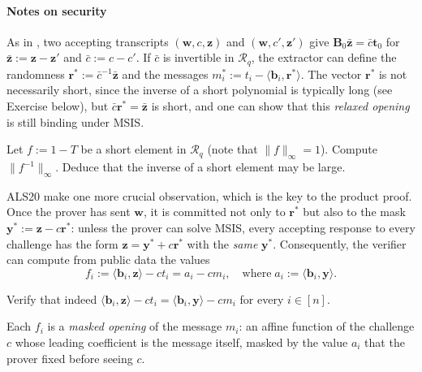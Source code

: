\documentclass[../../book.tex]{subfiles}
\begin{document}
\paragraph{Notes on security} As in , two accepting transcripts $(\mathbf{w}, c, \mathbf{z})$ and $(\mathbf{w}, c', \mathbf{z}')$ give $\mathbf{B}_0\bar{\mathbf{z}} = \bar{c}\mathbf{t}_0$ for $\bar{\mathbf{z}} := \mathbf{z}-\mathbf{z}'$ and $\bar{c} := c-c'$.
If $\bar{c}$ is invertible in $\mathcal{R}_q$, the extractor can define the randomness $\mathbf{r}^{\ast} := \bar{c}^{-1}\bar{\mathbf{z}}$ and the messages $m_i^{\ast} := t_i - \langle \mathbf{b}_i, \mathbf{r}^{\ast} \rangle$.
The vector $\mathbf{r}^{\ast}$ is not necessarily short, since the inverse of a short polynomial is typically long (see Exercise below), but $\bar{c}\mathbf{r}^{\ast} = \bar{\mathbf{z}}$ is short, and one can show that this \emph{relaxed opening} is still binding under MSIS.

\begin{exercise}
    Let $f := 1-T$ be a short element in $\mathcal{R}_q$ (note that $\|f\|_{\infty}=1$). 
    Compute $\|f^{-1}\|_{\infty}$.
    Deduce that the inverse of a short element may be large.

\end{exercise}

ALS20 make one more crucial observation, which is the key to the product proof.
Once the prover has sent $\mathbf{w}$, it is committed not only to $\mathbf{r}^{\ast}$ but also to the mask $\mathbf{y}^{\ast} := \mathbf{z} - c\mathbf{r}^{\ast}$: unless the prover can solve MSIS, every accepting response to every challenge has the form $\mathbf{z} = \mathbf{y}^{\ast} + c\mathbf{r}^{\ast}$ with the \emph{same} $\mathbf{y}^{\ast}$.
Consequently, the verifier can compute from public data the values
\begin{equation*}
    f_i := \langle \mathbf{b}_i, \mathbf{z} \rangle - ct_i = a_i - cm_i, \quad \text{where} \; a_i := \langle \mathbf{b}_i, \mathbf{y} \rangle.
\end{equation*}

\begin{exercise}
    Verify that indeed $\langle \mathbf{b}_i, \mathbf{z} \rangle - ct_i = \langle \mathbf{b}_i, \mathbf{y} \rangle - cm_i$ for every $i \in [n]$.
\end{exercise}

Each $f_i$ is a \emph{masked opening} of the message $m_i$: an affine function of the challenge $c$ whose leading coefficient is the message itself, masked by the value $a_i$ that the prover fixed before seeing $c$.
\end{document}
